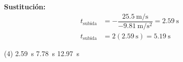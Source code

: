 \documentclass[12pt, letter]{exam}
\begin{document}
\begin{questions}
    \vspace*{0.3cm}
    \textbf{Sustitución:}
    \begin{align*}
    t_{\text{subida}} &= - \dfrac{\displaystyle \SI[per-mode=fraction]{25.5}{\meter\per\second}}{\displaystyle \SI[per-mode=fraction]{-9.81}{\meter\per\square\second}} = \SI{2.59}{\second} \\[0.5em]
    t_{\text{subida}} &= 2 \left( \SI{2.59}{\second} \right) = \SI{5.19}{\second}
    \end{align*}
    \begin{tasks}(4)
        \task \SI{2.59}{\second}
        \task {}
        \task \SI{7.78}{\second}
        \task \SI{12.97}{\second}
    \end{tasks}


\end{questions}
\end{document}
